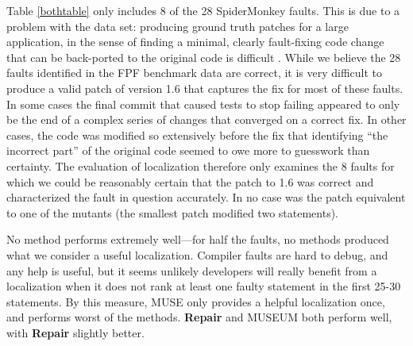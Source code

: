 Table \ref{bothtable} only includes 8 of the 28 SpiderMonkey faults.  This is due to a problem with the data set:  producing ground truth patches for a large application, in the sense of finding a minimal, clearly fault-fixing code change that can be back-ported to the original code is difficult \cite{PLDI13}.  While we believe the 28 faults identified in the FPF benchmark data are correct, it is very difficult to produce a valid patch of version 1.6 that captures the fix for most of these faults.  In some cases the final commit that caused tests to stop failing appeared to only be the end of a complex series of changes that converged on a correct fix.  In other cases, the code was modified so extensively before the fix that identifying ``the incorrect part'' of the original code seemed to owe more to guesswork than certainty.  The evaluation of localization therefore only examines the 8 faults for which we could be reasonably certain that the patch to 1.6 was correct and characterized the fault in question accurately.  In no case was the patch equivalent to one of the mutants (the smallest patch modified two statements).

No method performs extremely well---for half the faults, no methods produced what we consider a useful localization.   Compiler faults are hard to debug, and any help is useful, but it seems unlikely developers will really benefit from a localization when it does not rank at least one faulty statement in the first 25-30 statements.  By this measure, MUSE only provides a helpful localization once, and performs worst of the methods.  {\bf Repair} and MUSEUM both perform well, with {\bf Repair} slightly better.

